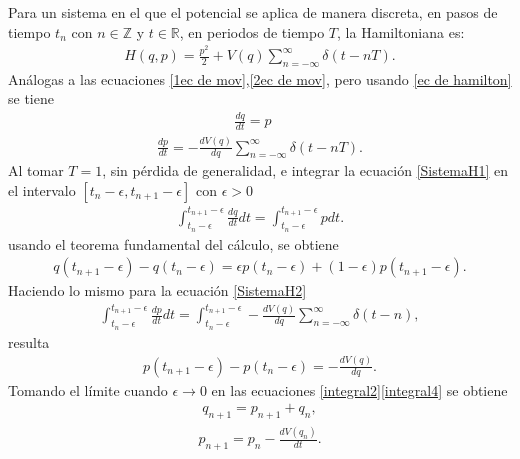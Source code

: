 Para un sistema en el que el potencial se aplica de manera discreta, en pasos de tiempo $t_{n}$ con $n\in\mathbb{Z}$ y $t\in\mathbb{R}$, en periodos de tiempo $T$, la Hamiltoniana es:
\begin{eqnarray}
H(q,p)=\frac{p^{2}}{2}+V(q)\sum_{n=-\infty}^{\infty}\delta(t-nT).
\label{ec de hamilton} 
\end{eqnarray}
Análogas a las ecuaciones \ref{1ec de mov},\ref{2ec de mov}, pero usando \ref{ec de hamilton} se tiene 
\begin{eqnarray}
\frac{dq}{dt}=p\quad
\label{SistemaH1}
\end{eqnarray}
\begin{eqnarray}
\frac{dp}{dt}=-\frac{dV(q)}{dq}\sum_{n=-\infty}^{\infty}\delta(t-nT).
\label{SistemaH2}
\end{eqnarray}
Al tomar $T=1$, sin pérdida de generalidad, e integrar la ecuación \eqref{SistemaH1} en el intervalo $[t_{n}-\epsilon,t_{n+1}-\epsilon]$ con $\epsilon>0$
\begin{eqnarray}
\int_{t_{n}-\epsilon}^{t_{n+1}-\epsilon}\frac{dq}{dt}dt=\int_{t_{n}-\epsilon}^{t_{n+1}-\epsilon}pdt.
\label{integral1}
\end{eqnarray}
usando el teorema fundamental del cálculo, se obtiene
\begin{eqnarray}
q(t_{n+1}-\epsilon)-q(t_{n}-\epsilon)=\epsilon p(t_{n}-\epsilon)+(1-\epsilon)p(t_{n+1}-\epsilon).
\label{integral2}
\end{eqnarray}
Haciendo lo mismo para la ecuación \eqref{SistemaH2}
\begin{eqnarray}
\int_{t_{n}-\epsilon}^{t_{n+1}-\epsilon}\frac{dp}{dt}dt=\int_{t_{n}-\epsilon}^{t_{n+1}-\epsilon}-\frac{dV(q)}{dq}\sum_{n=-\infty}^{\infty}\delta(t-n),
\label{integral3}
\end{eqnarray}
resulta
\begin{eqnarray}
p(t_{n+1}-\epsilon)-p(t_{n}-\epsilon)=-\frac{dV(q)}{dq}.
\label{integral4}
\end{eqnarray}
Tomando el límite cuando $\epsilon\rightarrow 0$ en las ecuaciones \eqref{integral2}\eqref{integral4} se obtiene
\begin{eqnarray}
q_{n+1}=p_{n+1}+q_{n},
\label{sistema hamilton a}
\end{eqnarray}
\begin{eqnarray}
p_{n+1}=p_{n}-\frac{dV(q_{n})}{dt}.
\label{sistema hamilton b}
\end{eqnarray}






